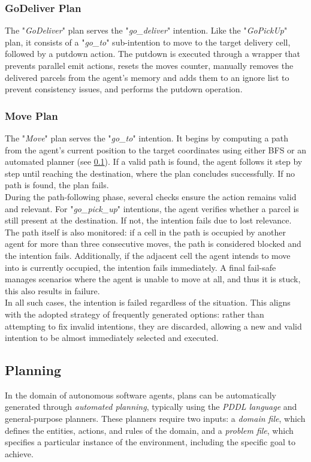         \subsubsection{GoDeliver Plan}
            The "\textit{GoDeliver}" plan serves the "\textit{go\_deliver}" intention. Like the "\textit{GoPickUp}" plan, it consists of a "\textit{go\_to}" sub-intention to move to the target delivery cell, followed by a putdown action. The putdown is executed through a wrapper that prevents parallel emit actions, resets the moves counter, manually removes the delivered parcels from the agent's memory and adds them to an ignore list to prevent consistency issues, and performs the putdown operation.

        \subsubsection{Move Plan}
            The "\textit{Move}" plan serves the "\textit{go\_to}" intention. It begins by computing a path from the agent's current position to the target coordinates using either BFS or an automated planner (see \ref{planning}). If a valid path is found, the agent follows it step by step until reaching the destination, where the plan concludes successfully. If no path is found, the plan fails.
            \medskip\\
            During the path-following phase, several checks ensure the action remains valid and relevant. For "\textit{go\_pick\_up}" intentions, the agent verifies whether a parcel is still present at the destination. If not, the intention fails due to lost relevance. The path itself is also monitored: if a cell in the path is occupied by another agent for more than three consecutive moves, the path is considered blocked and the intention fails. Additionally, if the adjacent cell the agent intends to move into is currently occupied, the intention fails immediately. A final fail-safe manages scenarios where the agent is unable to move at all, and thus it is stuck, this also results in failure.
            \medskip\\
            In all such cases, the intention is failed regardless of the situation. This aligns with the adopted strategy of frequently generated options: rather than attempting to fix invalid intentions, they are discarded, allowing a new and valid intention to be almost immediately selected and executed.

    \subsection{Planning}\label{planning}
        In the domain of autonomous software agents, plans can be automatically generated through \textit{automated planning}, typically using the \textit{PDDL language} and general-purpose planners. These planners require two inputs: a \textit{domain file}, which defines the entities, actions, and rules of the domain, and a \textit{problem file}, which specifies a particular instance of the environment, including the specific goal to achieve.

